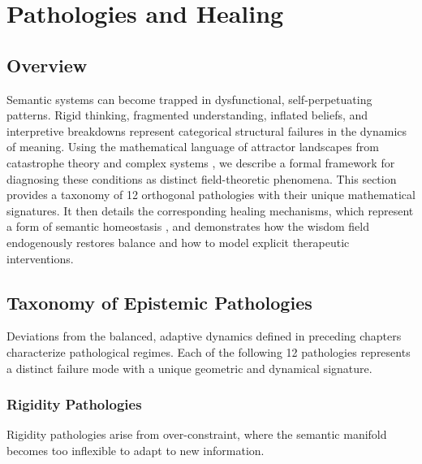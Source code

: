 \chapter{Pathologies and Healing}

\section{Overview}

Semantic systems can become trapped in dysfunctional, self-perpetuating patterns. Rigid thinking, fragmented understanding, inflated beliefs, and interpretive breakdowns represent categorical structural failures in the dynamics of meaning. Using the mathematical language of attractor landscapes from catastrophe theory and complex systems \autocite{Thom1975, Zeeman1977, Milnor1985}, we describe a formal framework for diagnosing these conditions as distinct field-theoretic phenomena. This section provides a taxonomy of 12 orthogonal pathologies with their unique mathematical signatures. It then details the corresponding healing mechanisms, which represent a form of semantic homeostasis \autocite{Cannon1932}, and demonstrates how the wisdom field endogenously restores balance and how to model explicit therapeutic interventions.

\section{Taxonomy of Epistemic Pathologies}

Deviations from the balanced, adaptive dynamics defined in preceding chapters characterize pathological regimes. Each of the following 12 pathologies represents a distinct failure mode with a unique geometric and dynamical signature.

\subsection{Rigidity Pathologies}

Rigidity pathologies arise from over-constraint, where the semantic manifold becomes too inflexible to adapt to new information.

